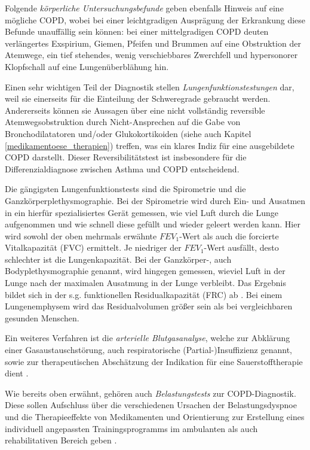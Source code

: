 Folgende \emph{körperliche Untersuchungsbefunde} geben ebenfalls Hinweis auf eine mögliche COPD, wobei bei einer leichtgradigen Ausprägung der Erkrankung diese Befunde unauffällig sein können: bei einer mittelgradigen COPD deuten verlängertes Exspirium, Giemen, Pfeifen und Brummen auf eine Obstruktion der Atemwege, ein tief stehendes, wenig verschiebbares Zwerchfell und hypersonorer Klopfschall auf eine Lungenüberblähung hin. 

Einen sehr wichtigen Teil der Diagnostik stellen \emph{Lungenfunktionstestungen} dar, weil sie einerseits für die Einteilung der Schweregrade gebraucht werden. Andererseits können sie Aussagen über eine nicht vollständig reversible Atemwegsobstruktion durch Nicht-Ansprechen auf die Gabe von Bronchodilatatoren und/oder Glukokortikoiden (siehe auch Kapitel \ref{medikamentoese_therapien}) treffen, was ein klares Indiz für eine ausgebildete COPD darstellt. Dieser Reversibilitätstest ist insbesondere für die Differenzialdiagnose zwischen Asthma und COPD entscheidend. 

Die gängigsten Lungenfunktionstests sind die Spirometrie und die Ganzkörperplethysmographie. Bei der Spirometrie wird durch Ein- und Ausatmen in ein hierfür spezialisiertes Gerät gemessen, wie viel Luft durch die Lunge aufgenommen und wie schnell diese gefüllt und wieder geleert werden kann. Hier wird sowohl der oben mehrmals erwähnte $FEV_{1}$-Wert als auch die forcierte Vitalkapazität (FVC) ermittelt. Je niedriger der $FEV_{1}$-Wert ausfällt, desto schlechter ist die Lungenkapazität. Bei der Ganzkörper-, auch Bodyplethysmographie genannt, wird hingegen gemessen, wieviel Luft in der Lunge nach der maximalen Ausatmung in der Lunge verbleibt. Das Ergebnis bildet sich in der s.g. funktionellen Residualkapazität (FRC) ab \autocite[vgl.][e6f.]{vogelmeier2007}. Bei einem Lungenemphysem wird das Residualvolumen größer sein als bei vergleichbaren gesunden Menschen. 

Ein weiteres Verfahren ist die \emph{arterielle Blutgasanalyse}, welche zur Abklärung einer Gasaustauschstörung, auch respiratorische (Partial-)Insuffizienz genannt, sowie zur therapeutischen Abschätzung der Indikation für eine Sauerstofftherapie dient \autocite[190]{welte2007}.

Wie bereits oben erwähnt, gehören auch \emph{Belastungstests} zur COPD-Diagnostik. Diese sollen Aufschluss über die verschiedenen Ursachen der Belastungsdyspnoe und die Therapieeffekte von Medikamenten und Orientierung zur Erstellung eines individuell angepassten Trainingsprogramms im ambulanten als auch rehabilitativen Bereich geben \autocite[vgl.][e7]{vogelmeier2007}. 


